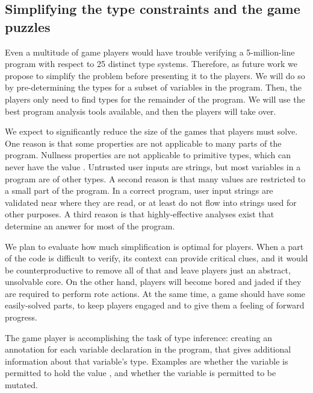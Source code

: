 \documentclass{sig-alternate}
\def\<#1>{\codeid{#1}}
\newcommand{\codeid}[1]{\ifmmode{\mbox{\ttfamily{#1}}}\else{\ttfamily #1}\fi}
\begin{document}
\subsection{Simplifying the type constraints and the game puzzles}
\label{sec:simplification}

Even a multitude of game players would have trouble verifying a
5-million-line program with respect to 25 distinct type systems.
Therefore, as future work we propose to simplify the problem before presenting it to the
players.  We will do so by pre-determining the types for a subset of
variables in the program.  Then, the players only need to find types for
the remainder of the program.  We will use the best program analysis tools
available, and then the players will take over.

We expect to significantly reduce the size of the games that players must
solve.  One reason is that some properties are not applicable to many parts
of the program.  Nullness properties are not applicable to primitive types,
which can never have the value \<null>.  Untrusted user inputs are strings,
but most variables in a program are of other types.  A second reason is
that many values are restricted to a small part of the program.  In a
correct program, user input strings are validated near where they are read,
or at least do not flow into strings used for other purposes.  A third
reason is that highly-effective analyses exist that determine an
answer for most of the program.

We plan to evaluate how much simplification is optimal for players.  When a
part of the code is difficult to verify, its context can provide critical
clues, and it would be counterproductive to remove all of that and leave
players just an abstract, unsolvable core.  On the other hand, players will
become bored and jaded if they are required to perform rote actions.  At
the same time, a game should have some easily-solved parts, to keep players
engaged and to give them a feeling of forward progress.


The game player is accomplishing the task of type inference:  creating an
annotation for each variable declaration in the program, that gives
additional information about that variable's type.  Examples are whether
the variable is permitted to hold the value \<null>, and whether the
variable is permitted to be mutated.
\end{document}
